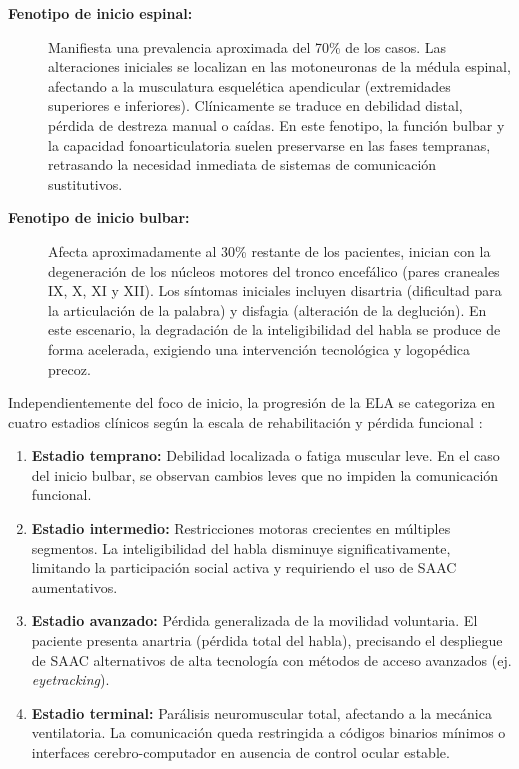 \begin{description}
    	\item[\textbf{Fenotipo de inicio espinal:}] Manifiesta una prevalencia aproximada del 70\% de los casos. Las alteraciones iniciales se localizan en las motoneuronas de la médula espinal, afectando a la musculatura esquelética apendicular (extremidades superiores e inferiores). 			Clínicamente se traduce en debilidad distal, pérdida de destreza manual o caídas. En este fenotipo, la función bulbar y la capacidad fonoarticulatoria suelen preservarse en las fases tempranas, retrasando la necesidad inmediata de sistemas de comunicación sustitutivos.
   	 \item[\textbf{Fenotipo de inicio bulbar:}] Afecta aproximadamente al 30\% restante de los pacientes, inician con la degeneración de los núcleos motores del tronco encefálico (pares craneales IX, X, XI y XII). Los síntomas iniciales incluyen disartria (dificultad para la articulación de la 		palabra) y disfagia (alteración de la deglución). En este escenario, la degradación de la inteligibilidad del habla se produce de forma acelerada, exigiendo una intervención tecnológica y logopédica precoz. \cite{rong2024multimodal, rico2021comunicacion}
\end{description}

Independientemente del foco de inicio, la progresión de la ELA se categoriza en cuatro estadios clínicos según la escala de rehabilitación y pérdida funcional \cite{pmc2025stage}:
\begin{enumerate}
    \item \textbf{Estadio temprano:} Debilidad localizada o fatiga muscular leve. En el caso del inicio bulbar, se observan cambios leves que no impiden la comunicación funcional.
    \item \textbf{Estadio intermedio:} Restricciones motoras crecientes en múltiples segmentos. La inteligibilidad del habla disminuye significativamente, limitando la participación social activa y requiriendo el uso de SAAC aumentativos.
    \item \textbf{Estadio avanzado:} Pérdida generalizada de la movilidad voluntaria. El paciente presenta anartria (pérdida total del habla), precisando el despliegue de SAAC alternativos de alta tecnología con métodos de acceso avanzados (ej. \textit{eyetracking}).
    \item \textbf{Estadio terminal:} Parálisis neuromuscular total, afectando a la mecánica ventilatoria. La comunicación queda restringida a códigos binarios mínimos o interfaces cerebro-computador en ausencia de control ocular estable.
\end{enumerate}

